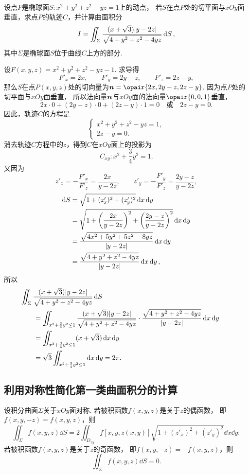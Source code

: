 \begin{example}
设点\(P\)是椭球面\(S: x^2 + y^2 + z^2 - yz = 1\)上的动点，
若\(S\)在点\(P\)处的切平面与\(xOy\)面垂直，求点\(P\)的轨迹\(C\)，并计算曲面积分\[
	I = \iint_\Sigma \frac{(x+\sqrt{3}) \abs{y-2z}}{\sqrt{4+y^2+z^2-4yz}} \dd{S},
\]
其中\(\Sigma\)是椭球面\(S\)位于曲线\(C\)上方的部分.
\begin{solution}
设\(F(x,y,z) = x^2 + y^2 + z^2 - yz - 1\).
求导得\[
	F'_x = 2x, \qquad
	F'_y = 2y - z, \qquad
	F'_z = 2z - y,
\]
那么\(S\)在点\(P(x,y,z)\)处的切向量为\(\vb{n} = \opair{2x,2y-z,2z-y}\).
因为点\(P\)处的切平面与\(xOy\)面垂直，
所以法向量\(\boldsymbol{n}\)与\(xOy\)面的法向量\(\opair{0,0,1}\)垂直，\[
	2x\cdot0 + (2y-z)\cdot0+(2z-y)\cdot1=0
	\quad\text{或}\quad
	2z-y=0.
\]
因此，轨迹\(C\)的方程是\[
	\begin{cases}
		x^2 + y^2 + z^2 - yz = 1, \\
		2z-y=0.
	\end{cases}
\]
消去轨迹\(C\)方程中的\(z\)，得到\(C\)在\(xOy\)面上的投影为\[
	C_{xy}: x^2+\frac{3}{4}y^2=1.
\]
又因为\[
	z'_x = - \frac{F'_x}{F'_z} = \frac{2x}{y-2z}, \qquad
	z'_y = - \frac{F'_y}{F'_z} = \frac{2y-z}{y-2z},
\]
\begin{align*}
	\dd{S} &= \sqrt{1+(z'_x)^2+(z'_y)^2} \dd{x}\dd{y} \\
	&= \sqrt{1+\left(\frac{2x}{y-2z}\right)^2+\left(\frac{2y-z}{y-2z}\right)^2} \dd{x}\dd{y} \\
	&= \frac{\sqrt{4x^2+5y^2+5z^2-8yz}}{\abs{y-2z}} \dd{x}\dd{y} \\
	&= \frac{\sqrt{4+y^2+z^2-4yz}}{\abs{y-2z}} \dd{x}\dd{y},
\end{align*}
所以\begin{align*}
	&\hspace{-20pt}
	\iint_\Sigma \frac{(x+\sqrt{3}) \abs{y-2z}}{\sqrt{4+y^2+z^2-4yz}} \dd{S} \\
	&= \iint_{x^2+\frac{3}{4}y^2\leq1} \frac{(x+\sqrt{3}) \abs{y-2z}}{\sqrt{4+y^2+z^2-4yz}}
		\cdot \frac{\sqrt{4+y^2+z^2-4yz}}{\abs{y-2z}} \dd{x}\dd{y} \\
	&= \iint_{x^2+\frac{3}{4}y^2\leq1} (x+\sqrt{3}) \dd{x}\dd{y} \\
	&= \sqrt{3} \iint_{x^2+\frac{3}{4}y^2\leq1} \dd{x}\dd{y}
	= 2\pi.
\end{align*}
\end{solution}
\end{example}

\subsection{利用对称性简化第一类曲面积分的计算}
设积分曲面\(\Sigma\)关于\(xOy\)面对称.
若被积函数\(f(x,y,z)\)是关于\(z\)的偶函数，
即\(f(x,y,-z) = f(x,y,z)\)，则\[
	\iint_\Sigma f(x,y,z) \dd{S}
	= 2 \iint_{D_{xy}} f[x,y,z(x,y)] \sqrt{1+(z'_x)^2+(z'_y)^2} \dd{x}\dd{y};
\]
若被积函数\(f(x,y,z)\)是关于\(z\)的奇函数，
即\(f(x,y,-z) = -f(x,y,z)\)，则\[
	\iint_\Sigma f(x,y,z) \dd{S} = 0.
\]

